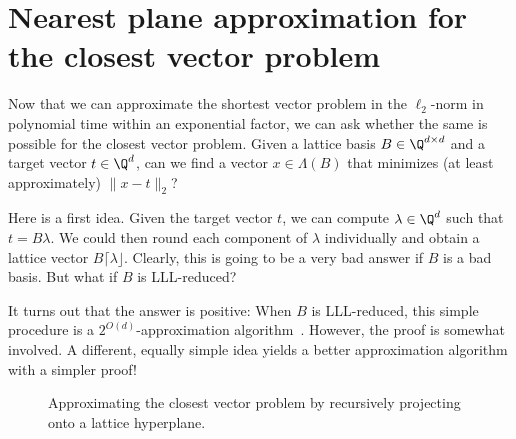 \section{Nearest plane approximation for the closest vector problem}
\label{sec:nearest-plane-approximation}

Now that we can approximate the shortest vector problem in the $\ell_2$-norm
in polynomial time within an exponential factor,
we can ask whether the same is possible for the closest vector problem.
Given a lattice basis $B \in \Q^{d \times d}$ and a target vector $t \in \Q^d$,
can we find a vector $x \in \Lambda(B)$ that minimizes (at least approximately) $\|x-t\|_2$?

Here is a first idea.
Given the target vector $t$, we can compute $\lambda \in \Q^d$
such that $t = B \lambda$.
We could then round each component of $\lambda$ individually
and obtain a lattice vector $B \lceil \lambda \rfloor$.
Clearly, this is going to be a very bad answer if $B$ is a bad basis.
But what if $B$ is LLL-reduced?

It turns out that the answer is positive:
When $B$ is LLL-reduced, this simple procedure is a $2^{O(d)}$-approximation algorithm~\cite{MR856638}.
However, the proof is somewhat involved.
A different, equally simple idea yields a better approximation algorithm with a simpler proof!

\begin{figure}
\begin{center}
\end{center}
  \caption{Approximating the closest vector problem by recursively projecting onto a lattice hyperplane.}
  \label{fig:nearest-plane-approximation}
\end{figure}

